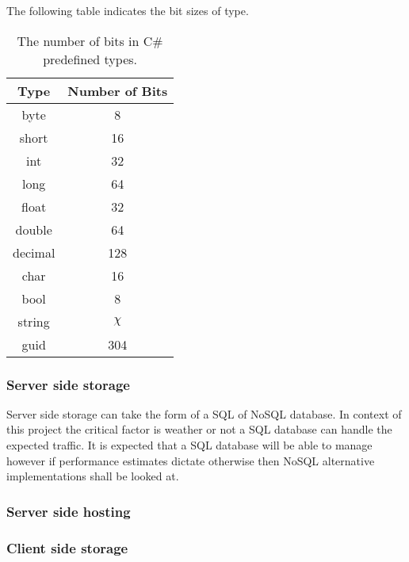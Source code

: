 \documentclass[a4paper,open right,12pt]{report}
\begin{document}
The following table indicates the bit sizes of type.
\begin{table}[ht]
\centering
\caption{The number of bits in C\# predefined types.}
    \begin{tabular}[t]{cc}
    \hline
        Type & Number of Bits\\
    \hline
        byte & 8 \\
        short & 16 \\
        int & 32 \\
        long & 64 \\
        float & 32 \\
        double & 64 \\
        decimal & 128 \\
        char & 16 \\
        bool & 8 \\
        string & $\chi$ \\
        guid & 304\\
    \hline
    \end{tabular}
\end{table}

\subsubsection{Server side storage}
Server side storage can take the form of a SQL of NoSQL database. In context of this project the critical factor is weather or not a SQL database can handle the expected traffic. It is expected that a SQL database will be able to manage however if performance estimates dictate otherwise then NoSQL alternative implementations shall be looked at.

\subsubsection{Server side hosting}

\subsubsection{Client side storage}
\end{document}
